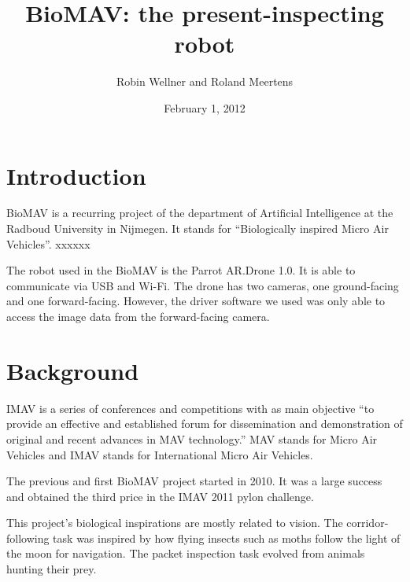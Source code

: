 \documentclass[a4paper,10pt]{article}
\begin{document}
\title{BioMAV: the present-inspecting robot}

\author{Robin Wellner and Roland Meertens}

\date{February 1, 2012}

\maketitle


\section{Introduction}
BioMAV is a recurring project of the department of Artificial
Intelligence at the Radboud University in Nijmegen. It stands for
``Biologically inspired Micro Air Vehicles''. xxxxxx

The robot used in the BioMAV is the Parrot AR.Drone 1.0. It is able to
communicate via USB and Wi-Fi. The drone has two cameras, one
ground-facing and one forward-facing. However, the driver software we
used was only able to access the image data from the forward-facing
camera.

\section{Background}
IMAV is a series of conferences and competitions with as main objective
``to provide an effective and established forum for dissemination and
demonstration of original and recent advances in MAV technology.''\cite{imav}
MAV stands for Micro Air Vehicles and IMAV stands for International
Micro Air Vehicles.

The previous and first BioMAV project started in 2010. It was a large
success and obtained the third price in the IMAV 2011 pylon challenge.

This project's biological inspirations are mostly related to vision. The
corridor-following task was inspired by how flying insects such as moths
follow the light of the moon for navigation. The packet inspection task
evolved from animals hunting their prey.
\end{document}
